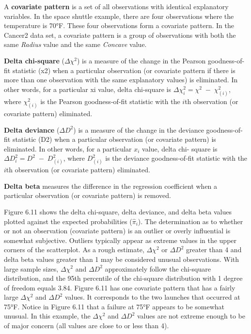 \documentclass[
]{report}
\begin{document}
A \textbf{covariate pattern} is a set of all observations with identical explanatory variables. In the space shuttle example, there are four observations where the temperature is 70°F. These four observations form a covariate pattern. In the Cancer2 data set, a covariate pattern is a group of observations with both the same \emph{Radius} value and the same \emph{Concave} value.

\textbf{Delta chi-square} (\(\Delta \chi^2\)) is a measure of the change in the Pearson goodness-of-fit statistic (x2) when a
particular observation (or covariate pattern if there is more than one observation with the same explanatory
values) is eliminated. In other words, for a particular xi value, delta chi-square is \(\Delta \chi^2_i = \chi^2 \;-\;\chi^2_{(i)}\), where \(\chi^2_{(i)}\) is the Pearson goodness‐of‐fit statistic with the \(i\)th observation (or covariate pattern) eliminated.

\textbf{Delta deviance} (\(\Delta D^2\)) is a measure of the change in the deviance goodness-of-fit statistic (D2) when a
particular observation (or covariate pattern) is eliminated. In other words, for a particular \(x_i\) value, delta chi-
square is \(\Delta D^2_i = D^2 \;-\; D^2_{(i)}\), where \(D^2_{(i)}\) is the deviance goodness‐of‐fit statistic with the \(i\)th observation (or covariate pattern) eliminated.

\textbf{Delta beta} measures the difference in the regression coefficient when a particular observation (or covariate pattern) is removed.

Figure 6.11 shows the delta chi‐square, delta deviance, and delta beta values plotted against the expected probabilities (\(\hat\pi_i\)). The determination as to whether or not an observation (covariate pattern) is an outlier or overly influential is somewhat subjective. Outliers typically appear as extreme values in the upper corners of the scatterplot. As a rough estimate, \(\Delta\chi^2\) or \(\Delta D^2\) greater than 4 and delta beta values greater than 1 may be considered unusual observations. With large sample sizes, \(\Delta\chi^2\) and \(\Delta D^2\) approximately follow the chi‐square distribution, and the 95th percentile of the chi‐square distribution with 1 degree of freedom equals 3.84. Figure 6.11 has one covariate pattern that has a fairly large \(\Delta\chi^2\) and \(\Delta D^2\) values. It corresponds to the two launches that occurred at 75°F. Notice in Figure 6.11 that a failure at 75°F appears to be somewhat unusual. In this example, the \(\Delta\chi^2\) and \(\Delta D^2\) values are not extreme enough to be of major concern (all values are close to or less than 4).
\end{document}
